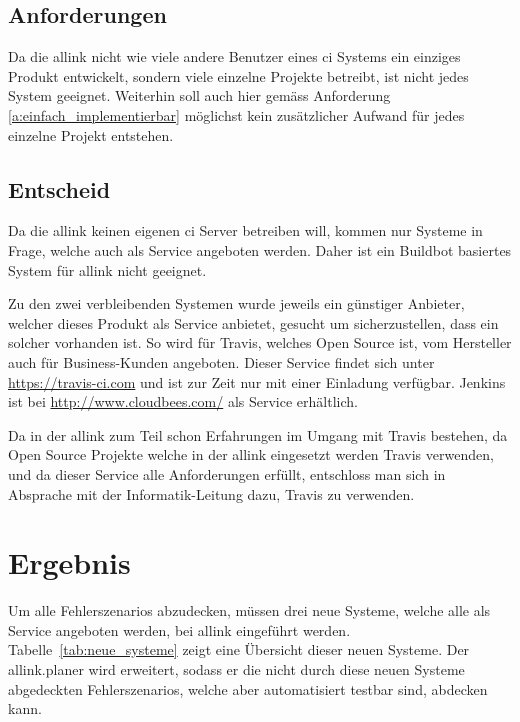 \subsection{Anforderungen}
\label{sub:anforderungen}
Da die allink nicht wie viele andere Benutzer eines \acrshort{ci} Systems ein einziges Produkt entwickelt, sondern viele einzelne Projekte betreibt, ist nicht jedes System geeignet. Weiterhin soll auch hier gemäss Anforderung \ref{a:einfach_implementierbar} möglichst kein zusätzlicher Aufwand für jedes einzelne Projekt entstehen.

\subsection{Entscheid}
\label{sub:entscheid_ci}
Da die allink keinen eigenen \acrshort{ci} Server betreiben will, kommen nur Systeme in Frage, welche auch als Service angeboten werden. Daher ist ein Buildbot basiertes System für allink nicht geeignet.

Zu den zwei verbleibenden Systemen wurde jeweils ein günstiger Anbieter, welcher dieses Produkt als Service anbietet, gesucht um sicherzustellen, dass ein solcher vorhanden ist. So wird für Travis, welches Open Source ist, vom Hersteller auch für Business-Kunden angeboten. Dieser Service findet sich unter \url{https://travis-ci.com} und ist zur Zeit nur mit einer Einladung verfügbar. Jenkins ist bei \url{http://www.cloudbees.com/} als Service erhältlich.
 
Da in der allink zum Teil schon Erfahrungen im Umgang mit Travis bestehen, da Open Source Projekte welche in der allink eingesetzt werden Travis verwenden, und da dieser Service alle Anforderungen erfüllt, entschloss man sich in Absprache mit der Informatik-Leitung dazu, Travis zu verwenden.

\section{Ergebnis}
\label{sec:ergebnis}
Um alle Fehlerszenarios abzudecken, müssen drei neue Systeme, welche alle als Service angeboten werden, bei allink eingeführt werden. Tabelle~\ref{tab:neue_systeme} zeigt eine Übersicht dieser neuen Systeme. Der allink.planer wird erweitert, sodass er die nicht durch diese neuen Systeme abgedeckten Fehlerszenarios, welche aber automatisiert testbar sind, abdecken kann.

\makeatletter
{} \setcounter{lnumber}{0}
\renewcommand\thelnumber{L\arabic{lnumber}}
\newcommand{\newlnumber}[3]%
{%
\midrule%
\refstepcounter{lnumber}%
\expandafter\xdef\csname l#2\endcsname {#1}%
\thelnumber\label{l:#2} & #1 & #3 \\
}
\makeatother

